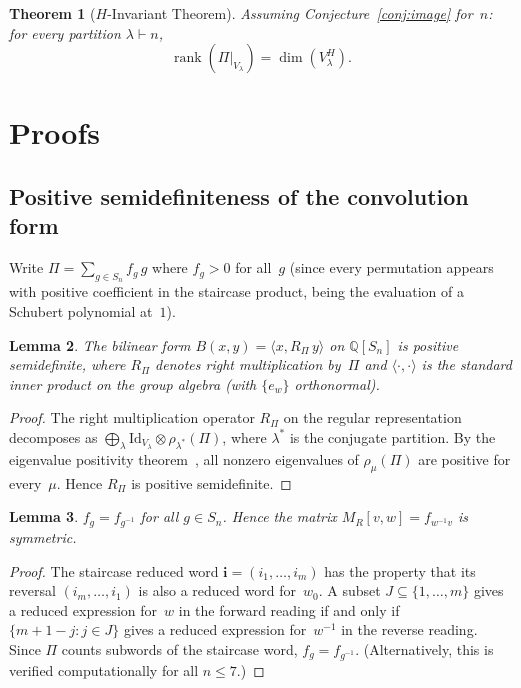 \documentclass[11pt]{article}
\newtheorem{theorem}{Theorem}
\newtheorem{lemma}[theorem]{Lemma}
\theoremstyle{definition}
\theoremstyle{remark}
\begin{document}
\begin{theorem}[$H$-Invariant Theorem]\label{thm:Hinvariant}
Assuming Conjecture~\ref{conj:image} for~$n$: for every partition
$\lambda \vdash n$,
\[
  \operatorname{rank}(\Pi|_{V_\lambda}) = \dim(V_\lambda^H).
\]
\end{theorem}

\section{Proofs}

\subsection{Positive semidefiniteness of the convolution form}

Write $\Pi = \sum_{g \in S_n} f_g \, g$ where $f_g > 0$ for all~$g$
(since every permutation appears with positive coefficient in the
staircase product, being the evaluation of a Schubert polynomial at~$1$).

\begin{lemma}\label{lem:psd}
The bilinear form $B(x, y) = \langle x, R_\Pi \, y \rangle$
on $\mathbb{Q}[S_n]$ is positive semidefinite, where $R_\Pi$
denotes right multiplication by~$\Pi$ and $\langle \cdot, \cdot \rangle$
is the standard inner product on the group algebra
(with $\{e_w\}$ orthonormal).
\end{lemma}

\begin{proof}
The right multiplication operator $R_\Pi$ on the regular representation
decomposes as $\bigoplus_\lambda \mathrm{Id}_{V_\lambda} \otimes \rho_{\lambda^*}(\Pi)$,
where $\lambda^*$ is the conjugate partition.
By the eigenvalue positivity theorem~\cite{Clio-EP},
all nonzero eigenvalues of $\rho_\mu(\Pi)$ are positive for every~$\mu$.
Hence $R_\Pi$ is positive semidefinite.
\end{proof}

\begin{lemma}\label{lem:symmetric}
$f_g = f_{g^{-1}}$ for all $g \in S_n$.
Hence the matrix $M_R[v,w] = f_{w^{-1}v}$ is symmetric.
\end{lemma}

\begin{proof}
The staircase reduced word $\mathbf{i} = (i_1, \ldots, i_m)$ has the
property that its reversal $(i_m, \ldots, i_1)$ is also a reduced word
for~$w_0$.
A subset $J \subseteq \{1, \ldots, m\}$ gives a reduced expression
for~$w$ in the forward reading if and only if $\{m+1-j : j \in J\}$
gives a reduced expression for~$w^{-1}$ in the reverse reading.
Since $\Pi$ counts subwords of the staircase word,
$f_g = f_{g^{-1}}$.
(Alternatively, this is verified computationally for all $n \leq 7$.)
\end{proof}
\end{document}
